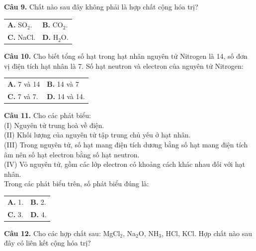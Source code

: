 \documentclass{article}
\begin{document}
\newpage

\fontsize{26}{34}\selectfont

\textbf{Câu 9.} Chất nào sau đây không phải là hợp chất cộng hóa trị?
\vspace{6pt}

\begin{tabularx}{\linewidth}{@{}X X@{}}
\textbf{A.} SO$_{2}$. & \textbf{B.} CO$_{2}$.\\[8pt]
\textbf{C.} NaCl. & \textbf{D.} H$_{2}$O.
\end{tabularx}

\vspace*{\fill}

\textbf{Câu 10.} Cho biết tổng số hạt trong hạt nhân nguyên tử Nitrogen là 14, số đơn vị điện tích hạt nhân là 7. Số hạt neutron và electron của nguyên tử Nitrogen:
\vspace{6pt}

\begin{tabularx}{\linewidth}{@{}X X@{}}
\textbf{A.} 7 và 14 & \textbf{B.} 14 và 7\\[8pt]
\textbf{C.} 7 và 7. & \textbf{D.} 14 và 14.
\end{tabularx}

\newpage

\fontsize{26}{34}\selectfont

\textbf{Câu 11.} Cho các phát biểu:\\ (I) Nguyên tử trung hoà về điện.\\ (II) Khối lượng của nguyên tử tập trung chủ yếu ở hạt nhân.\\ (III) Trong nguyên tử, số hạt mang điện tích dương bằng số hạt mang điện tích âm nên số hạt electron bằng số hạt neutron.\\ (IV) Vỏ nguyên tử, gồm các lớp electron có khoảng cách khác nhau đối với hạt nhân.\\ Trong các phát biểu trên, số phát biểu đúng là:
\vspace{6pt}

\begin{tabularx}{\linewidth}{@{}X X@{}}
\textbf{A.} 1. & \textbf{B.} 2.\\[8pt]
\textbf{C.} 3. & \textbf{D.} 4.
\end{tabularx}

\vspace*{\fill}

\textbf{Câu 12.} Cho các hợp chất sau: MgCl$_{2}$, Na$_{2}$O, NH$_{3}$, HCl, KCl. Hợp chất nào sau đây có liên kết cộng hóa trị?
\vspace{6pt}
\end{document}
